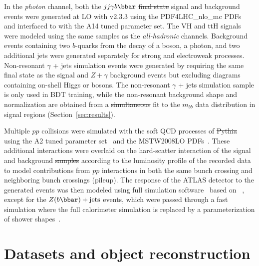 \documentclass[PAPER, american,coverpage,texlive=2016, english]{\ATLASLATEXPATH atlasdoc}
\providecommand{\DIFadd}[1]{{\protect\color{blue}\uwave{#1}}} %
\providecommand{\DIFdel}[1]{{\protect\color{red}\sout{#1}}}                      %
\providecommand{\DIFaddbegin}{} %
\providecommand{\DIFaddend}{} %
\providecommand{\DIFdelbegin}{} %
\providecommand{\DIFdelend}{} %
\begin{document}
In the \textit{photon} channel, both the $jj\gamma b\bbar$ \DIFdelbegin \DIFdel{final state }\DIFdelend \DIFaddbegin \DIFadd{final-state }\DIFaddend signal and background events were generated at LO with \MGMCatNLO v2.3.3 using the PDF4LHC\_nlo\_mc PDFs~\cite{Butterworth:2015oua} and interfaced to  with the A14 tuned parameter set.  The VH and ttH signals were modeled using the same samples as the \textit{all-hadronic} channels.
Background events containing two $b$-quarks from the decay of a \Zboson boson, a photon, and two additional jets were generated separately for strong and electroweak processes.
Non-resonant $\gamma$ + jets simulation events were generated by requiring the same final state as the signal and $Z + \gamma$ background events but excluding diagrams containing on-shell Higgs or \Zboson bosons. The non-resonant $\gamma$ + jets simulation sample is only used in BDT training, while the non-resonant background shape and normalization are obtained from a \DIFdelbegin \DIFdel{simultaneous }\DIFdelend fit to the $m_{bb}$ data distribution in signal regions (Section~\ref{sec:results}).

Multiple $pp$ collisions were simulated with the soft QCD processes of \DIFdelbegin \DIFdel{Pythia }\DIFdelend \DIFaddbegin \PYTHIA \DIFaddend 8.186~\cite{Sjostrand:2007gs} using the A2 tuned parameter set~\cite{ATL-PHYS-PUB-2012-003} and the MSTW2008LO PDFs~\cite{Martin:2009iq}.
These additional interactions were overlaid on the hard-scatter interaction of the signal and background \DIFdelbegin \DIFdel{samples
}\DIFdelend \DIFaddbegin \DIFadd{samplesz
}\DIFaddend according to the luminosity profile of the recorded data to model contributions from $pp$ interactions in both the same bunch crossing and neighboring bunch crossings (pileup).
The response of the ATLAS detector to the generated events was then modeled using full simulation software~\cite{SOFT-2010-01} based on ~\cite{Agostinelli:2002hh}, except for the $Z(b\bbar)+\text{jets}$ events, which were passed through a fast simulation where the full calorimeter simulation is replaced by a parameterization of shower shapes~\cite{ATL-PHYS-PUB-2010-013}.

\section{Datasets and object reconstruction}
\label{sec:objects}
\end{document}
